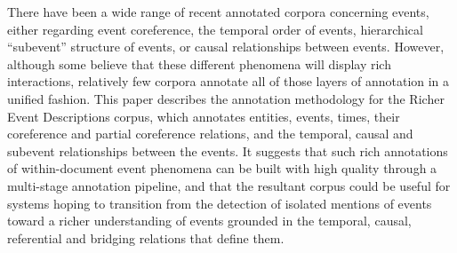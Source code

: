 There have been a wide range of recent annotated corpora concerning events, either regarding event coreference, the temporal order of events, hierarchical ``subevent'' structure of events, or causal relationships between events. However, although some believe that these different phenomena will display rich interactions, relatively few corpora annotate all of those layers of annotation in a unified fashion.  This paper describes the annotation methodology for the Richer Event Descriptions corpus, which annotates entities, events, times, their coreference and partial coreference relations, and the temporal, causal and subevent relationships between the events.                                It suggests that such rich annotations of within-document event phenomena can be built with high quality through a multi-stage annotation pipeline, and that the resultant corpus could be useful for systems hoping to transition from the detection of isolated mentions of events toward a richer understanding of events grounded in the temporal, causal, referential and bridging relations that define them.
